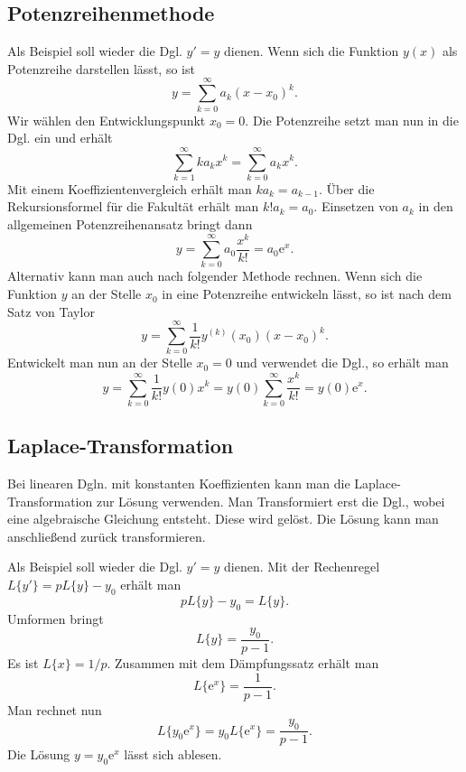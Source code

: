 \documentclass[a4paper,10pt,fleqn,twocolumn,twoside,openany]{article}
\numberwithin{equation}{section}
\newcommand{\ee}{\mathrm e}
\theoremstyle{definition}
\begin{document}
\subsection{Potenzreihenmethode}

Als Beispiel soll wieder die Dgl. $y'=y$ dienen.
Wenn sich die Funktion $y(x)$ als Potenzreihe darstellen lässt, so ist
\begin{equation}
y=\sum_{k=0}^\infty a_k(x-x_0)^k.
\end{equation}
Wir wählen den Entwicklungspunkt $x_0=0$. Die Potenzreihe setzt man
nun in die Dgl. ein und erhält
\begin{equation}
\sum_{k=1}^\infty ka_kx^k = \sum_{k=0}^\infty a_kx^k.
\end{equation}
Mit einem Koeffizientenvergleich erhält man $ka_k=a_{k-1}$.
Über die Rekursionsformel für die Fakultät erhält man $k!a_k=a_0$.
Einsetzen von $a_k$ in den allgemeinen Potenzreihenansatz bringt dann
\begin{equation}
y=\sum_{k=0}^\infty a_0\frac{x^k}{k!} = a_0\ee^x.
\end{equation}
Alternativ kann man auch nach folgender Methode rechnen.
Wenn sich die Funktion $y$ an der Stelle $x_0$ in eine Potenzreihe
entwickeln lässt, so ist nach dem Satz von Taylor
\begin{equation}
y = \sum_{k=0}^\infty \frac{1}{k!}y^{(k)}(x_0)(x-x_0)^k.
\end{equation}
Entwickelt man nun an der Stelle $x_0=0$ und verwendet die Dgl.,
so erhält man
\begin{equation}
y = \sum_{k=0}^\infty \frac{1}{k!}y(0)x^k
= y(0)\sum_{k=0}^\infty \frac{x^k}{k!}
= y(0)\ee^x.
\end{equation}

\subsection{Laplace-Transformation}

Bei linearen Dgln. mit konstanten Koeffizienten kann man die
Laplace-Transformation zur Lösung verwenden. Man Transformiert
erst die Dgl., wobei eine algebraische Gleichung entsteht. Diese
wird gelöst. Die Lösung kann man anschließend zurück transformieren.

Als Beispiel soll wieder die Dgl. $y'=y$ dienen. Mit der Rechenregel
$L\{y'\} = pL\{y\}-y_0$ erhält man
\begin{equation}
pL\{y\}-y_0 = L\{y\}.
\end{equation}
Umformen bringt
\begin{equation}
L\{y\} = \frac{y_0}{p-1}.
\end{equation}
Es ist $L\{x\} = 1/p$. Zusammen mit dem Dämpfungssatz erhält man
\begin{equation}
L\{\ee^x\} = \frac{1}{p-1}.
\end{equation}
Man rechnet nun
\begin{equation}
L\{y_0\ee^x\} = y_0L\{\ee^x\} = \frac{y_0}{p-1}.
\end{equation}
Die Lösung $y=y_0\ee^x$ lässt sich ablesen.
\end{document}
